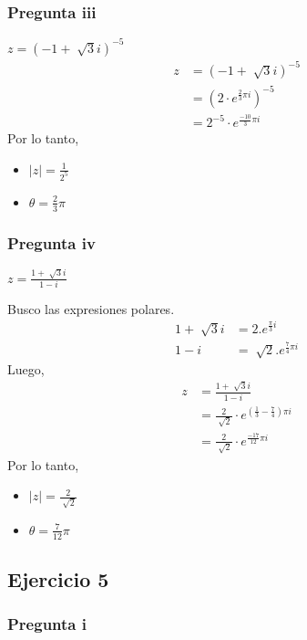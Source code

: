 \subsubsection{Pregunta iii}

$ z = (-1+\sqrt[]{3}i)^{-5} $
\begin{align*}
    z &= (-1+\sqrt[]{3}i)^{-5} \\
    &= (2\cdot e^{\frac{2}{3}\pi i })^{-5} \\
    &= 2^{-5}\cdot e^{\frac{-10}{3}\pi i }
\end{align*}
Por lo tanto,
\begin{itemize}
    \item $ |z| = \frac{1}{2^5} $
    \item $ \theta = \frac{2}{3}\pi $
\end{itemize}

\subsubsection{Pregunta iv}

$ z = \frac{1+\sqrt[]{3}i}{1-i} $

Busco las expresiones polares.
\begin{align*}
    1+\sqrt[]{3}i &= 2. e^{\frac{\pi}{3}i} \\
    1-i &= \sqrt[]{2}. e^{\frac{7}{4}\pi i}
\end{align*}
Luego,
\begin{align*}
    z &= \frac{1+\sqrt[]{3}i}{1-i} \\
    &= \frac{2}{\sqrt[]{2}} \cdot e^{(\frac{1}{3} - \frac{7}{4})\pi i} \\
    &= \frac{2}{\sqrt[]{2}} \cdot e^{\frac{-17}{12}\pi i}
\end{align*}
Por lo tanto,
\begin{itemize}
    \item $ |z| = \frac{2}{\sqrt[]{2}} $
    \item $ \theta = \frac{7}{12}\pi $
\end{itemize}

\subsection{Ejercicio 5}

\subsubsection{Pregunta i}

